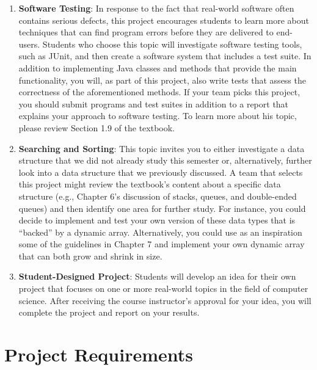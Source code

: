 \begin{enumerate}
  \item {\bf Software Testing}: In response to the fact that real-world software often contains serious defects, this
    project encourages students to learn more about techniques that can find program errors before they are delivered to
    end-users. Students who choose this topic will investigate software testing tools, such as JUnit, and then create
    a software system that includes a test suite. In addition to implementing Java classes and methods that provide the
    main functionality, you will, as part of this project, also write tests that assess the correctness of the
    aforementioned methods. If your team picks this project, you should submit programs and test suites in
    addition to a report that explains your approach to software testing. To learn more about his topic, please review
    Section 1.9 of the textbook.

  \item {\bf Searching and Sorting}: This topic invites you to either investigate a data structure that we did not already
    study this semester or, alternatively, further look into a data structure that we previously discussed. A team that
    selects this project might review the textbook's content about a specific data structure (e.g., Chapter 6's
    discussion of stacks, queues, and double-ended queues) and then identify one area for further study. For instance,
    you could decide to implement and test your own version of these data types that is ``backed'' by a dynamic array.
    Alternatively, you could use as an inspiration some of the guidelines in Chapter 7 and implement your own dynamic
    array that can both grow and shrink in size.

  \item {\bf Student-Designed Project}: Students will develop an idea for their own project that focuses on one or more
    real-world topics in the field of computer science. After receiving the course instructor's approval for your idea,
    you will complete the project and report on your results.

\end{enumerate}

\vspace*{-.15in}

\section*{Project Requirements}

